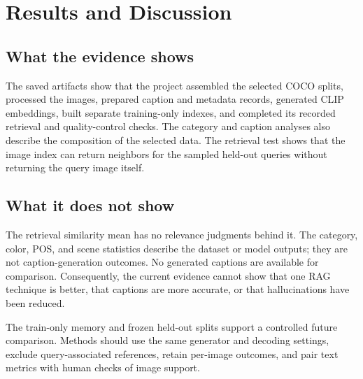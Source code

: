 \section{Results and Discussion}
\label{ch:discussion}

\subsection{What the evidence shows}
The saved artifacts show that the project assembled the selected COCO splits, processed the images, prepared caption and metadata records, generated CLIP embeddings, built separate training-only indexes, and completed its recorded retrieval and quality-control checks. The category and caption analyses also describe the composition of the selected data. The retrieval test shows that the image index can return neighbors for the sampled held-out queries without returning the query image itself.

\subsection{What it does not show}
The retrieval similarity mean has no relevance judgments behind it. The category, color, POS, and scene statistics describe the dataset or model outputs; they are not caption-generation outcomes. No generated captions are available for comparison. Consequently, the current evidence cannot show that one RAG technique is better, that captions are more accurate, or that hallucinations have been reduced.

The train-only memory and frozen held-out splits support a controlled future comparison. Methods should use the same generator and decoding settings, exclude query-associated references, retain per-image outcomes, and pair text metrics with human checks of image support.
